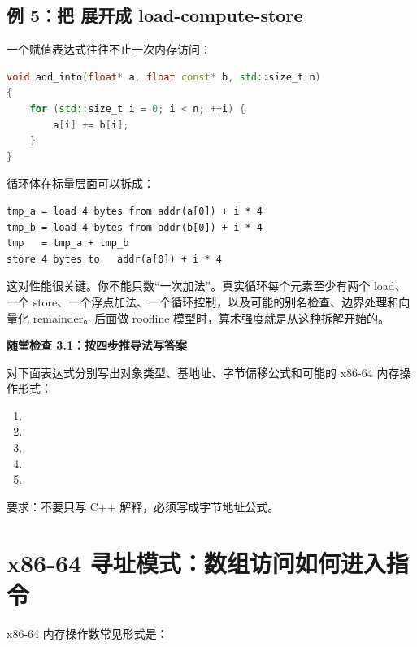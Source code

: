 \subsection{例 5：把  展开成 load-compute-store}

一个赋值表达式往往不止一次内存访问：

\begin{lstlisting}[language=C++]
void add_into(float* a, float const* b, std::size_t n)
{
    for (std::size_t i = 0; i < n; ++i) {
        a[i] += b[i];
    }
}
\end{lstlisting}

循环体在标量层面可以拆成：

\begin{lstlisting}
tmp_a = load 4 bytes from addr(a[0]) + i * 4
tmp_b = load 4 bytes from addr(b[0]) + i * 4
tmp   = tmp_a + tmp_b
store 4 bytes to   addr(a[0]) + i * 4
\end{lstlisting}

这对性能很关键。你不能只数“一次加法”。真实循环每个元素至少有两个 load、一个 store、一个浮点加法、一个循环控制，以及可能的别名检查、边界处理和向量化 remainder。后面做 roofline 模型时，算术强度就是从这种拆解开始的。

\begin{exercisebox}
\textbf{随堂检查 3.1：按四步推导法写答案}

对下面表达式分别写出对象类型、基地址、字节偏移公式和可能的 x86-64 内存操作形式：

\begin{enumerate}
  \item {}
  \item {}
  \item {}
  \item {}
  \item {}
\end{enumerate}

要求：不要只写 C++ 解释，必须写成字节地址公式。
\end{exercisebox}

\section{x86-64 寻址模式：数组访问如何进入指令}

x86-64 内存操作数常见形式是：

